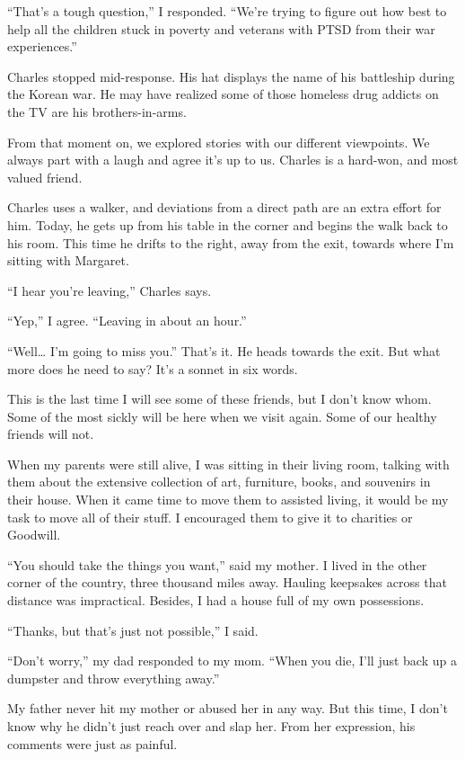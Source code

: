 \documentclass[
  letterpaper,
  DIV=11,
  numbers=noendperiod]{scrreprt}
\begin{document}
``That's a tough question,'' I responded. ``We're trying to figure out
how best to help all the children stuck in poverty and veterans with
PTSD from their war experiences.''

Charles stopped mid-response. His hat displays the name of his
battleship during the Korean war. He may have realized some of those
homeless drug addicts on the TV are his brothers-in-arms.

From that moment on, we explored stories with our different viewpoints.
We always part with a laugh and agree it's up to us. Charles is a
hard-won, and most valued friend.

Charles uses a walker, and deviations from a direct path are an extra
effort for him. Today, he gets up from his table in the corner and
begins the walk back to his room. This time he drifts to the right, away
from the exit, towards where I'm sitting with Margaret.

``I hear you're leaving,'' Charles says.

``Yep,'' I agree. ``Leaving in about an hour.''

``Well\ldots{} I'm going to miss you.'' That's it. He heads towards the
exit. But what more does he need to say? It's a sonnet in six words.

This is the last time I will see some of these friends, but I don't know
whom. Some of the most sickly will be here when we visit again. Some of
our healthy friends will not.

When my parents were still alive, I was sitting in their living room,
talking with them about the extensive collection of art, furniture,
books, and souvenirs in their house. When it came time to move them to
assisted living, it would be my task to move all of their stuff. I
encouraged them to give it to charities or Goodwill.

``You should take the things you want,'' said my mother. I lived in the
other corner of the country, three thousand miles away. Hauling
keepsakes across that distance was impractical. Besides, I had a house
full of my own possessions.

``Thanks, but that's just not possible,'' I said.

``Don't worry,'' my dad responded to my mom. ``When you die, I'll just
back up a dumpster and throw everything away.''

My father never hit my mother or abused her in any way. But this time, I
don't know why he didn't just reach over and slap her. From her
expression, his comments were just as painful.
\end{document}
